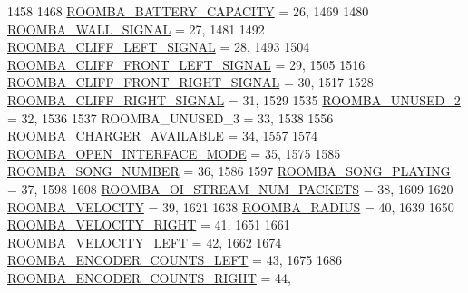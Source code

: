 \begin{DoxyCode}
1458 
1468   \hyperlink{group__roomba-lib_gga46f008b5055c4a08d3123c6a3478373eaa53df1ccfa1de33d1754272fa9edd804}{ROOMBA\_BATTERY\_CAPACITY} = 26,
1469 
1480   \hyperlink{group__roomba-lib_gga46f008b5055c4a08d3123c6a3478373ea820e04f3b6cf1fe3830dc773981e38cd}{ROOMBA\_WALL\_SIGNAL} = 27,
1481 
1492   \hyperlink{group__roomba-lib_gga46f008b5055c4a08d3123c6a3478373eaca31b264512f0b2561a98c474d9afcaf}{ROOMBA\_CLIFF\_LEFT\_SIGNAL} = 28,
1493 
1504   \hyperlink{group__roomba-lib_gga46f008b5055c4a08d3123c6a3478373eacb540adc5f1ba1e6d9bdb429dc4bad9b}{ROOMBA\_CLIFF\_FRONT\_LEFT\_SIGNAL} = 29,
1505 
1516   \hyperlink{group__roomba-lib_gga46f008b5055c4a08d3123c6a3478373ea9b156ee45545b742e7900a29b3e4dadf}{ROOMBA\_CLIFF\_FRONT\_RIGHT\_SIGNAL} = 30,
1517 
1528   \hyperlink{group__roomba-lib_gga46f008b5055c4a08d3123c6a3478373ea3430e06a7beb23fd86879c2c404e802e}{ROOMBA\_CLIFF\_RIGHT\_SIGNAL} = 31,
1529 
1535   \hyperlink{group__roomba-lib_gga46f008b5055c4a08d3123c6a3478373ea96857c95ae47a3687fa89cbee702c45f}{ROOMBA\_UNUSED\_2} = 32,
1536 
1537   ROOMBA\_UNUSED\_3 = 33,
1538 
1556   \hyperlink{group__roomba-lib_gga46f008b5055c4a08d3123c6a3478373ea837e14ab43e08cf649b5ab37556023de}{ROOMBA\_CHARGER\_AVAILABLE} = 34,
1557 
1574   \hyperlink{group__roomba-lib_gga46f008b5055c4a08d3123c6a3478373eae25dca775bd76962783a86811ea93b74}{ROOMBA\_OPEN\_INTERFACE\_MODE} = 35,
1575 
1585   \hyperlink{group__roomba-lib_gga46f008b5055c4a08d3123c6a3478373eadc89af73d417da0fe50b1c642a8898b9}{ROOMBA\_SONG\_NUMBER} = 36,
1586 
1597   \hyperlink{group__roomba-lib_gga46f008b5055c4a08d3123c6a3478373ea974977adff508d49ff6ae6137d14299a}{ROOMBA\_SONG\_PLAYING} = 37,
1598 
1608   \hyperlink{group__roomba-lib_gga46f008b5055c4a08d3123c6a3478373ead75c3ca1795b78e599fe29b5927de5fd}{ROOMBA\_OI\_STREAM\_NUM\_PACKETS} = 38,
1609 
1620   \hyperlink{group__roomba-lib_gga46f008b5055c4a08d3123c6a3478373eac813a8d1be0b3f7780aa56aa280a426b}{ROOMBA\_VELOCITY} = 39,
1621 
1638   \hyperlink{group__roomba-lib_gga46f008b5055c4a08d3123c6a3478373ea59a616d59cce7972a21c6803d1e3e047}{ROOMBA\_RADIUS} = 40,
1639 
1650   \hyperlink{group__roomba-lib_gga46f008b5055c4a08d3123c6a3478373eae155dc459e649f7a3b38bd8c9b4b14b0}{ROOMBA\_VELOCITY\_RIGHT} = 41,
1651 
1661   \hyperlink{group__roomba-lib_gga46f008b5055c4a08d3123c6a3478373ea17b84d811ed8f98698e2ba5d477492ba}{ROOMBA\_VELOCITY\_LEFT} = 42,
1662 
1674   \hyperlink{group__roomba-lib_gga46f008b5055c4a08d3123c6a3478373eac09cc1853f89d600d088a1f558180572}{ROOMBA\_ENCODER\_COUNTS\_LEFT} = 43,
1675 
1686   \hyperlink{group__roomba-lib_gga46f008b5055c4a08d3123c6a3478373ea5918780386e79aadb498f23d3471c9da}{ROOMBA\_ENCODER\_COUNTS\_RIGHT} = 44,

\end{DoxyCode}
